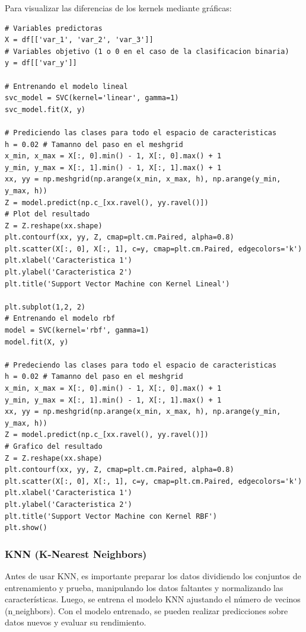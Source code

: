 \documentclass[a4paper, 12pt]{book}
\begin{document}
Para visualizar las diferencias de los kernels mediante gráficas:
\begin{verbatim}
# Variables predictoras
X = df[['var_1', 'var_2', 'var_3']]
# Variables objetivo (1 o 0 en el caso de la clasificacion binaria)
y = df[['var_y']]

# Entrenando el modelo lineal
svc_model = SVC(kernel='linear', gamma=1)
svc_model.fit(X, y)

# Prediciendo las clases para todo el espacio de caracteristicas
h = 0.02 # Tamanno del paso en el meshgrid
x_min, x_max = X[:, 0].min() - 1, X[:, 0].max() + 1
y_min, y_max = X[:, 1].min() - 1, X[:, 1].max() + 1
xx, yy = np.meshgrid(np.arange(x_min, x_max, h), np.arange(y_min, y_max, h))
Z = model.predict(np.c_[xx.ravel(), yy.ravel()])
# Plot del resultado
Z = Z.reshape(xx.shape)
plt.contourf(xx, yy, Z, cmap=plt.cm.Paired, alpha=0.8)
plt.scatter(X[:, 0], X[:, 1], c=y, cmap=plt.cm.Paired, edgecolors='k')
plt.xlabel('Caracteristica 1')
plt.ylabel('Caracteristica 2')
plt.title('Support Vector Machine con Kernel Lineal')

plt.subplot(1,2, 2)
# Entrenando el modelo rbf
model = SVC(kernel='rbf', gamma=1)
model.fit(X, y)

# Predeciendo las clases para todo el espacio de caracteristicas
h = 0.02 # Tamanno del paso en el meshgrid
x_min, x_max = X[:, 0].min() - 1, X[:, 0].max() + 1
y_min, y_max = X[:, 1].min() - 1, X[:, 1].max() + 1
xx, yy = np.meshgrid(np.arange(x_min, x_max, h), np.arange(y_min, y_max, h))
Z = model.predict(np.c_[xx.ravel(), yy.ravel()])
# Grafico del resultado
Z = Z.reshape(xx.shape)
plt.contourf(xx, yy, Z, cmap=plt.cm.Paired, alpha=0.8)
plt.scatter(X[:, 0], X[:, 1], c=y, cmap=plt.cm.Paired, edgecolors='k')
plt.xlabel('Caracteristica 1')
plt.ylabel('Caracteristica 2')
plt.title('Support Vector Machine con Kernel RBF')
plt.show()
\end{verbatim}


\subsubsection{KNN (K-Nearest Neighbors)}
Antes de usar KNN, es importante preparar los datos dividiendo los conjuntos de entrenamiento y prueba, manipulando los datos faltantes y normalizando las características. Luego, se entrena el modelo KNN ajustando el número de vecinos (n$\_$neighbors). Con el modelo entrenado, se pueden realizar predicciones sobre datos nuevos y evaluar su rendimiento.
\end{document}
